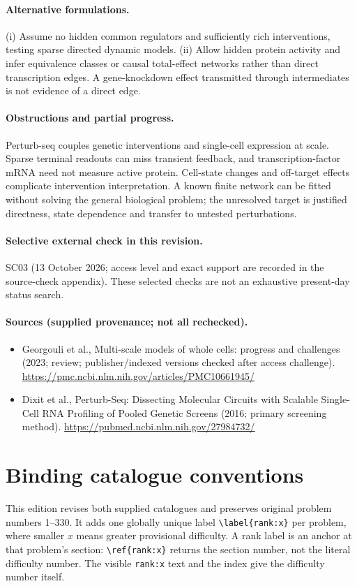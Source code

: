 \documentclass[11pt]{article}
\begin{document}
\paragraph{Alternative formulations.} (i) Assume no hidden common regulators and sufficiently rich interventions, testing sparse directed dynamic models. (ii) Allow hidden protein activity and infer equivalence classes or causal total-effect networks rather than direct transcription edges. A gene-knockdown effect transmitted through intermediates is not evidence of a direct edge.
\paragraph{Obstructions and partial progress.} Perturb-seq couples genetic interventions and single-cell expression at scale. Sparse terminal readouts can miss transient feedback, and transcription-factor mRNA need not measure active protein. Cell-state changes and off-target effects complicate intervention interpretation. A known finite network can be fitted without solving the general biological problem; the unresolved target is justified directness, state dependence and transfer to untested perturbations.
\paragraph{Selective external check in this revision.} SC03 (13 October 2026; access level and exact support are recorded in the source-check appendix). These selected checks are not an exhaustive present-day status search.

\paragraph{Sources (supplied provenance; not all rechecked).}
\begin{itemize}
\item Georgouli et al., Multi-scale models of whole cells: progress and challenges (2023; review; publisher/indexed versions checked after access challenge). \url{https://pmc.ncbi.nlm.nih.gov/articles/PMC10661945/}
\item Dixit et al., Perturb-Seq: Dissecting Molecular Circuits with Scalable Single-Cell RNA Profiling of Pooled Genetic Screens (2016; primary screening method). \url{https://pubmed.ncbi.nlm.nih.gov/27984732/}
\end{itemize}


\section*{Binding catalogue conventions}
This edition revises both supplied catalogues and preserves original problem numbers 1--330. It adds one globally unique label \verb|\label{rank:x}| per problem, where smaller $x$ means greater provisional difficulty. A rank label is an anchor at that problem's section: \verb|\ref{rank:x}| returns the section number, not the literal difficulty number. The visible \texttt{rank:x} text and the index give the difficulty number itself.
\end{document}

